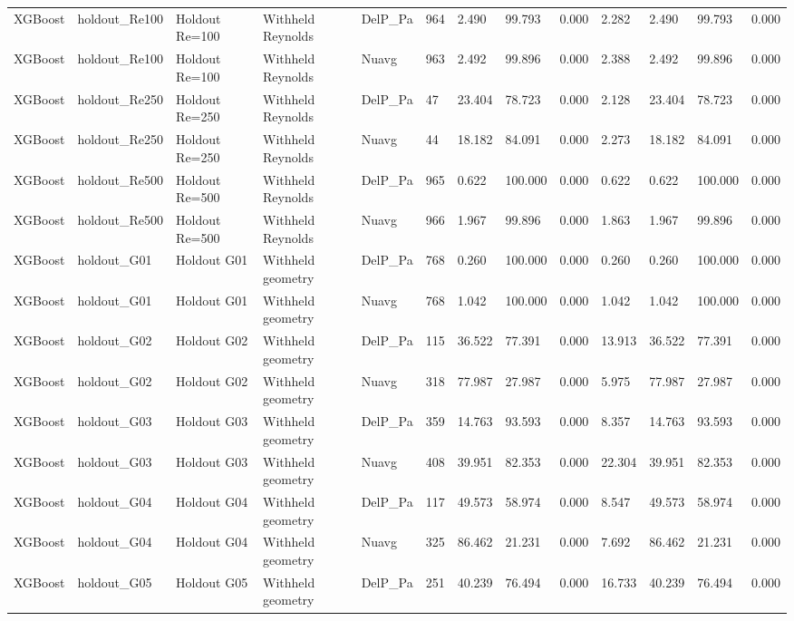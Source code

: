 \begin{tabular}{lllllllllllll}
XGBoost & holdout_Re100 & Holdout Re=100 & Withheld Reynolds & DelP_Pa & 964 & 2.490 & 99.793 & 0.000 & 2.282 & 2.490 & 99.793 & 0.000 \\
XGBoost & holdout_Re100 & Holdout Re=100 & Withheld Reynolds & Nuavg & 963 & 2.492 & 99.896 & 0.000 & 2.388 & 2.492 & 99.896 & 0.000 \\
XGBoost & holdout_Re250 & Holdout Re=250 & Withheld Reynolds & DelP_Pa & 47 & 23.404 & 78.723 & 0.000 & 2.128 & 23.404 & 78.723 & 0.000 \\
XGBoost & holdout_Re250 & Holdout Re=250 & Withheld Reynolds & Nuavg & 44 & 18.182 & 84.091 & 0.000 & 2.273 & 18.182 & 84.091 & 0.000 \\
XGBoost & holdout_Re500 & Holdout Re=500 & Withheld Reynolds & DelP_Pa & 965 & 0.622 & 100.000 & 0.000 & 0.622 & 0.622 & 100.000 & 0.000 \\
XGBoost & holdout_Re500 & Holdout Re=500 & Withheld Reynolds & Nuavg & 966 & 1.967 & 99.896 & 0.000 & 1.863 & 1.967 & 99.896 & 0.000 \\
XGBoost & holdout_G01 & Holdout G01 & Withheld geometry & DelP_Pa & 768 & 0.260 & 100.000 & 0.000 & 0.260 & 0.260 & 100.000 & 0.000 \\
XGBoost & holdout_G01 & Holdout G01 & Withheld geometry & Nuavg & 768 & 1.042 & 100.000 & 0.000 & 1.042 & 1.042 & 100.000 & 0.000 \\
XGBoost & holdout_G02 & Holdout G02 & Withheld geometry & DelP_Pa & 115 & 36.522 & 77.391 & 0.000 & 13.913 & 36.522 & 77.391 & 0.000 \\
XGBoost & holdout_G02 & Holdout G02 & Withheld geometry & Nuavg & 318 & 77.987 & 27.987 & 0.000 & 5.975 & 77.987 & 27.987 & 0.000 \\
XGBoost & holdout_G03 & Holdout G03 & Withheld geometry & DelP_Pa & 359 & 14.763 & 93.593 & 0.000 & 8.357 & 14.763 & 93.593 & 0.000 \\
XGBoost & holdout_G03 & Holdout G03 & Withheld geometry & Nuavg & 408 & 39.951 & 82.353 & 0.000 & 22.304 & 39.951 & 82.353 & 0.000 \\
XGBoost & holdout_G04 & Holdout G04 & Withheld geometry & DelP_Pa & 117 & 49.573 & 58.974 & 0.000 & 8.547 & 49.573 & 58.974 & 0.000 \\
XGBoost & holdout_G04 & Holdout G04 & Withheld geometry & Nuavg & 325 & 86.462 & 21.231 & 0.000 & 7.692 & 86.462 & 21.231 & 0.000 \\
XGBoost & holdout_G05 & Holdout G05 & Withheld geometry & DelP_Pa & 251 & 40.239 & 76.494 & 0.000 & 16.733 & 40.239 & 76.494 & 0.000 \\

\end{tabular}

